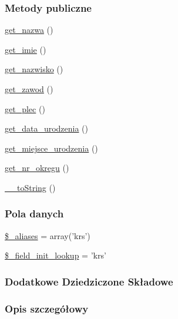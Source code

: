 \subsubsection*{Metody publiczne}
\begin{DoxyCompactItemize}
\item 
\hyperlink{classep___k_r_s___wpis_ac0818f0049d7b84f08f77128f54cee36}{get\-\_\-nazwa} ()
\item 
\hyperlink{classep___k_r_s___wpis_ac4b0c85dc2a130038f2d118dbd0c3d77}{get\-\_\-imie} ()
\item 
\hyperlink{classep___k_r_s___wpis_abdd1d7ff92508da7f748ba1feec97af0}{get\-\_\-nazwisko} ()
\item 
\hyperlink{classep___k_r_s___wpis_af80ca8310b60004454dd02a387deaa2c}{get\-\_\-zawod} ()
\item 
\hyperlink{classep___k_r_s___wpis_ac7f9af5c3fa024e4c26a7b6bd4ce4bb4}{get\-\_\-plec} ()
\item 
\hyperlink{classep___k_r_s___wpis_a880b240cd2d8c336fd1709bf0cb1ae2c}{get\-\_\-data\-\_\-urodzenia} ()
\item 
\hyperlink{classep___k_r_s___wpis_ac57c08ec5e394a19c5bd9280c8376182}{get\-\_\-miejsce\-\_\-urodzenia} ()
\item 
\hyperlink{classep___k_r_s___wpis_a2645a9f0aa5b0ccc482943348c033d0a}{get\-\_\-nr\-\_\-okregu} ()
\item 
\hyperlink{classep___k_r_s___wpis_a7516ca30af0db3cdbf9a7739b48ce91d}{\-\_\-\-\_\-to\-String} ()
\end{DoxyCompactItemize}
\subsubsection*{Pola danych}
\begin{DoxyCompactItemize}
\item 
\hyperlink{classep___k_r_s___wpis_ab4e31d75f0bc5d512456911e5d01366b}{\$\-\_\-aliases} = array('krs')
\item 
\hyperlink{classep___k_r_s___wpis_a4a4d54ae35428077a7c61ec8a5139af3}{\$\-\_\-field\-\_\-init\-\_\-lookup} = 'krs'
\end{DoxyCompactItemize}
\subsubsection*{Dodatkowe Dziedziczone Składowe}


\subsubsection{Opis szczegółowy}



